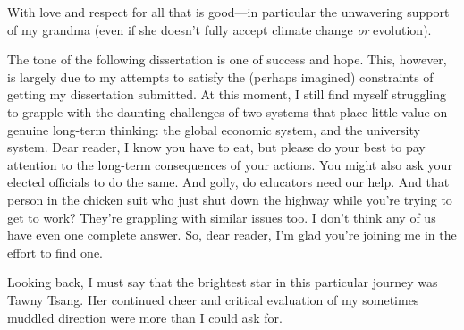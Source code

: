\documentclass[12pt]{myucthesis}
\begin{document}
\begin{frontmatter}

\begin{dedication}
\null\vfil
{\large
\begin{center}
With love and respect for all that is good---in particular the unwavering
support of my grandma (even if she doesn't fully accept climate change \emph{or}
evolution).
\end{center} }
\null\vfil
\end{dedication}

\tableofcontents
\listoffigures %
\listoftables %


\begin{acknowledgements}

The tone of the following dissertation is one of success and hope. This,
however, is largely due to my attempts to satisfy the (perhaps imagined)
constraints of getting my dissertation submitted. At this moment, I still find
myself struggling to grapple with the daunting challenges of two systems that
place little value on genuine long-term thinking: the global economic system,
and the university system. Dear reader, I know you have to eat, but please do
your best to pay attention to the long-term consequences of your actions. You
might also ask your elected officials to do the same. And golly, do educators
need our help. And that person in the chicken suit who just shut down the
highway while you're trying to get to work? They're grappling with similar
issues too. I don't think any of us have even one complete answer. So, dear
reader, I'm glad you're joining me in the effort to find one.

Looking back, I must say that the brightest star in this particular journey was
Tawny Tsang. Her continued cheer and critical evaluation of my sometimes muddled
direction were more than I could ask for. 


\end{acknowledgements}
\end{frontmatter}
\end{document}

